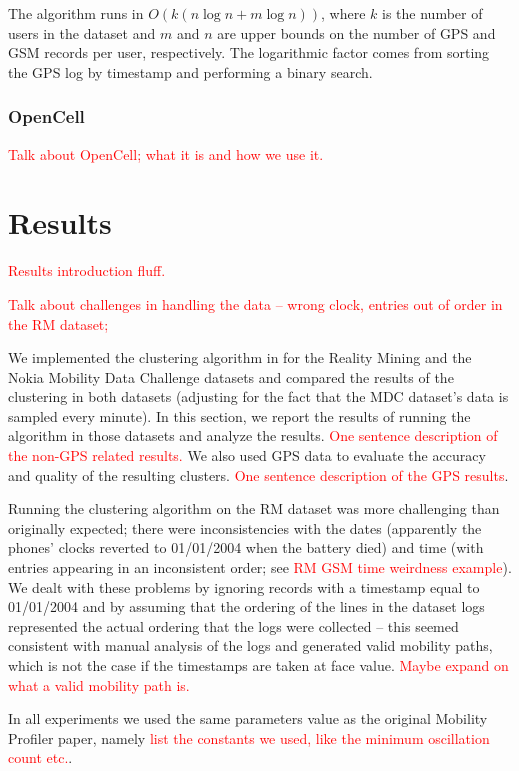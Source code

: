 \documentclass[a4paper,10pt]{article}
\newcommand{\xxx}[1]{\textcolor{red}{#1}}
\begin{document}
The algorithm runs in $O(k(n\log n + m\log n))$, where $k$ is the number of users in the dataset and $m$ and $n$ are upper bounds on the number of GPS and GSM records per user, respectively. The logarithmic factor comes from sorting the GPS log by timestamp and performing a binary search.

\subsubsection{OpenCell}

\xxx{Talk about OpenCell; what it is and how we use it.}

\section{Results}

\xxx{Results introduction fluff.}

\xxx{Talk about challenges in handling the data -- wrong clock, entries out of order in the RM dataset;}

We implemented the clustering algorithm in \cite{mobilityprofiler} for the Reality Mining and the Nokia Mobility Data Challenge datasets and compared the results of the clustering in both datasets (adjusting for the fact that the MDC dataset's data is sampled every minute). In this section, we report the results of running the algorithm in those datasets and analyze the results. \xxx{One sentence description of the non-GPS related results.} We also used GPS data to evaluate the accuracy and quality of the resulting clusters. \xxx{One sentence description of the GPS results}.

Running the clustering algorithm on the RM dataset was more challenging than originally expected; there were inconsistencies with the dates (apparently the phones' clocks reverted to 01/01/2004 when the battery died) and time (with entries appearing in an inconsistent order; see \xxx{RM GSM time weirdness example}). We dealt with these problems by ignoring records with a timestamp equal to 01/01/2004 and by assuming that the ordering of the lines in the dataset logs represented the actual ordering that the logs were collected -- this seemed consistent with manual analysis of the logs and generated valid mobility paths, which is not the case if the timestamps are taken at face value. \xxx{Maybe expand on what a valid mobility path is.}

In all experiments we used the same parameters value as the original Mobility Profiler paper, namely \xxx{list the constants we used, like the minimum oscillation count etc.}.
\end{document}
